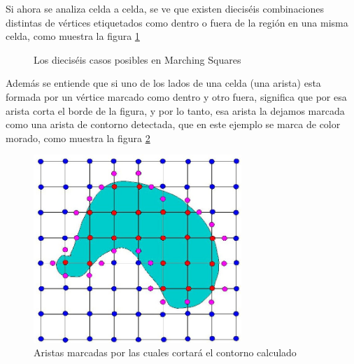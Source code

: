 Si ahora se analiza celda a celda, se ve que existen dieciséis combinaciones distintas de 
vértices etiquetados como dentro o fuera de la región en una misma celda, como muestra la figura 
\ref{f:estadoDelArte:cases}

\begin{figure}
\centering
\caption{Los dieciséis casos posibles en Marching Squares}
\label{f:estadoDelArte:cases}
\end{figure}

Además se entiende que si uno de los lados de una celda (una arista) esta formada por un 
vértice marcado como dentro y otro fuera, significa que por esa arista corta el borde de la figura, 
y por lo tanto, esa arista la dejamos marcada como una arista de contorno detectada, que en este 
ejemplo se marca de color morado, como muestra la figura \ref{f:estadoDelArte:purpledobj}

\begin{figure}
\centering
	\includegraphics[width=0.7\textwidth]{images/marchingsquare/purpledobj.jpg}
\caption{Aristas marcadas por las cuales cortará el contorno calculado}
\label{f:estadoDelArte:purpledobj}
\end{figure}

